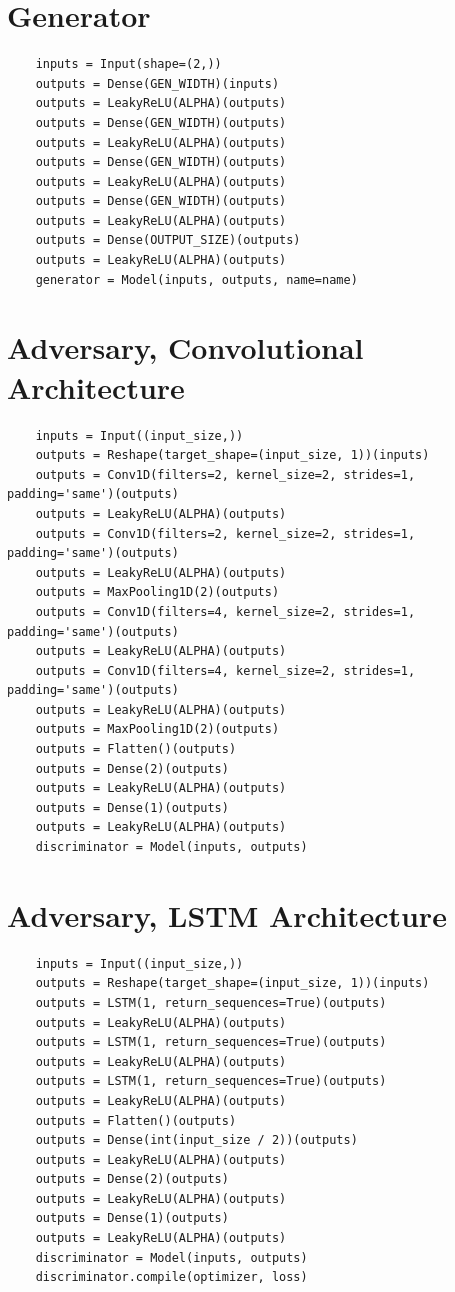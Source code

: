 \documentclass[12pt, titlepage]{report}
\theoremstyle{definition}
\begin{document}
\section{Generator}\label{appendix:generator}
\begin{verbatim}
    inputs = Input(shape=(2,))
    outputs = Dense(GEN_WIDTH)(inputs)
    outputs = LeakyReLU(ALPHA)(outputs)
    outputs = Dense(GEN_WIDTH)(outputs)
    outputs = LeakyReLU(ALPHA)(outputs)
    outputs = Dense(GEN_WIDTH)(outputs)
    outputs = LeakyReLU(ALPHA)(outputs)
    outputs = Dense(GEN_WIDTH)(outputs)
    outputs = LeakyReLU(ALPHA)(outputs)
    outputs = Dense(OUTPUT_SIZE)(outputs)
    outputs = LeakyReLU(ALPHA)(outputs)
    generator = Model(inputs, outputs, name=name)
\end{verbatim} 

\section{Adversary, Convolutional Architecture}\label{appendix:convolutional}
\begin{verbatim}
    inputs = Input((input_size,))
    outputs = Reshape(target_shape=(input_size, 1))(inputs)
    outputs = Conv1D(filters=2, kernel_size=2, strides=1, padding='same')(outputs)
    outputs = LeakyReLU(ALPHA)(outputs)
    outputs = Conv1D(filters=2, kernel_size=2, strides=1, padding='same')(outputs)
    outputs = LeakyReLU(ALPHA)(outputs)
    outputs = MaxPooling1D(2)(outputs)
    outputs = Conv1D(filters=4, kernel_size=2, strides=1, padding='same')(outputs)
    outputs = LeakyReLU(ALPHA)(outputs)
    outputs = Conv1D(filters=4, kernel_size=2, strides=1, padding='same')(outputs)
    outputs = LeakyReLU(ALPHA)(outputs)
    outputs = MaxPooling1D(2)(outputs)
    outputs = Flatten()(outputs)
    outputs = Dense(2)(outputs)
    outputs = LeakyReLU(ALPHA)(outputs)
    outputs = Dense(1)(outputs)
    outputs = LeakyReLU(ALPHA)(outputs)
    discriminator = Model(inputs, outputs)
\end{verbatim}

\section{Adversary, LSTM Architecture}\label{appendix:lstm}
\begin{verbatim}
    inputs = Input((input_size,))
    outputs = Reshape(target_shape=(input_size, 1))(inputs)
    outputs = LSTM(1, return_sequences=True)(outputs)
    outputs = LeakyReLU(ALPHA)(outputs)
    outputs = LSTM(1, return_sequences=True)(outputs)
    outputs = LeakyReLU(ALPHA)(outputs)
    outputs = LSTM(1, return_sequences=True)(outputs)
    outputs = LeakyReLU(ALPHA)(outputs)
    outputs = Flatten()(outputs)
    outputs = Dense(int(input_size / 2))(outputs)
    outputs = LeakyReLU(ALPHA)(outputs)
    outputs = Dense(2)(outputs)
    outputs = LeakyReLU(ALPHA)(outputs)
    outputs = Dense(1)(outputs)
    outputs = LeakyReLU(ALPHA)(outputs)
    discriminator = Model(inputs, outputs)
    discriminator.compile(optimizer, loss)
\end{verbatim}
\end{document}
